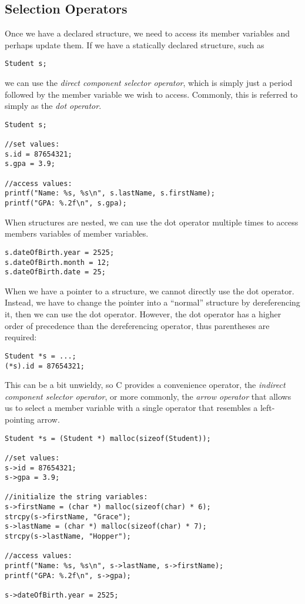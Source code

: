 \subsection{Selection Operators}

Once we have a declared structure, we need to access its member
variables and perhaps update them.  If we have a statically declared
structure, such as

\texttt{Student s;} 

we can use the \emph{direct component selector operator}, which is
simply just a period followed by the member variable we wish to 
access.  Commonly, this is referred to simply as the \emph{dot
operator}.

\begin{verbatim}
Student s;

//set values:
s.id = 87654321;
s.gpa = 3.9;

//access values:
printf("Name: %s, %s\n", s.lastName, s.firstName);
printf("GPA: %.2f\n", s.gpa);
\end{verbatim}

When structures are nested, we can use the dot operator multiple
times to access members variables of member variables.

\begin{verbatim}
s.dateOfBirth.year = 2525;
s.dateOfBirth.month = 12;
s.dateOfBirth.date = 25;
\end{verbatim}

When we have a pointer to a structure, we cannot directly use
the dot operator.  Instead, we have to change the pointer into
a ``normal'' structure by dereferencing it, then we can use the
dot operator.  However, the dot operator has a higher order of
precedence than the dereferencing operator, thus parentheses are 
required:

\begin{verbatim}
Student *s = ...;
(*s).id = 87654321;
\end{verbatim}

This can be a bit unwieldy, so C provides a convenience operator, 
the \emph{indirect component selector operator}, or more commonly,
the \emph{arrow operator} that allows us to select a member variable
with a single operator that resembles a left-pointing arrow.

\begin{verbatim}
Student *s = (Student *) malloc(sizeof(Student));

//set values:
s->id = 87654321;
s->gpa = 3.9;

//initialize the string variables:
s->firstName = (char *) malloc(sizeof(char) * 6);
strcpy(s->firstName, "Grace");
s->lastName = (char *) malloc(sizeof(char) * 7);
strcpy(s->lastName, "Hopper");

//access values:
printf("Name: %s, %s\n", s->lastName, s->firstName);
printf("GPA: %.2f\n", s->gpa);

s->dateOfBirth.year = 2525;
\end{verbatim}

